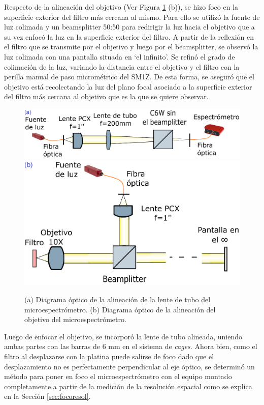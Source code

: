 Respecto de la alineación del objetivo (Ver Figura \ref{fig:ali} (b)), se hizo foco en la superficie exterior del filtro más cercana al mismo. Para ello se utilizó la fuente de luz colimada y un beamsplitter 50:50 para redirigir la luz hacia el objetivo que a su vez enfocó la luz en la superficie exterior del filtro. A partir de la reflexión en el filtro que se transmite por el objetivo y luego por el beamsplitter, se observó la luz colimada con una pantalla situada en `el infinito'.  Se refinó el grado de colimación de la luz, variando la distancia entre el objetivo y el filtro con la perilla manual de paso micrométrico del SM1Z. De esta forma, se aseguró que el objetivo está recolectando la luz del plano focal asociado a la superficie exterior del filtro más cercana al objetivo que es la que se quiere observar. 
\begin{figure}[H]
\hfill%
\includegraphics[width=1.0\textwidth]{Figs/microespectrometro/diagoptico_alinetubel.png}
\hfill%
\vspace{0.1cm}
\includegraphics[width=1.0\textwidth]{Figs/microespectrometro/diagoptico_alineobjet.png}
\hfill%
\hfill%
\caption{(a) Diagrama óptico de la alineación de la lente de tubo del microespectrómetro. (b) Diagrama óptico de la alineación del objetivo del microespectrómetro.}
\label{fig:ali}
\end{figure}

Luego de enfocar el objetivo, se incorporó la lente de tubo alineada, uniendo ambas partes con las barras de 6 mm en el sistema de \textit{cages}. Ahora bien, como el filtro al desplazarse con la platina puede salirse de foco dado que el desplazamiento no es perfectamente perpendicular al eje óptico, se determinó un método para poner en foco el microespectrómetro con el equipo montado completamente a partir de la medición de la resolución espacial como se explica en la Sección \ref{sec:focoresol}.

